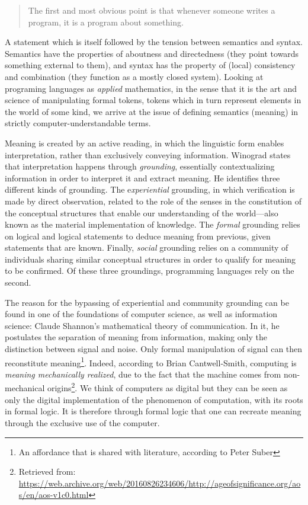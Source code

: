 \documentclass{article}
\begin{document}
\begin{quote}
  The first and most obvious point is that whenever someone writes a program, it is a program about something.\cite{winograd_language_1982}
\end{quote}

A statement which is itself followed by the tension between semantics and syntax. Semantics have the properties of aboutness and directedness (they point towards something external to them), and syntax has the property of (local) consistency and combination (they function as a mostly closed system). Looking at programing languages as \emph{applied} mathematics, in the sense that it is the art and science of manipulating formal tokens, tokens which in turn represent elements in the world of some kind, we arrive at the issue of defining semantics (meaning) in strictly computer-understandable terms.

Meaning is created by an active reading, in which the linguistic form enables interpretation, rather than exclusively conveying information. Winograd states that interpretation happens through \emph{grounding}, essentially contextualizing information in order to interpret it and extract meaning. He identifies three different kinds of grounding. The e\emph{xperiential} grounding, in which verification is made by direct observation, related to the role of the senses in the constitution of the conceptual structures that enable our understanding of the world—also known as the material implementation of knowledge. The \emph{formal} grounding relies on logical and logical statements to deduce meaning from previous, given statements that are known. Finally, \emph{social} grounding relies on a community of individuals sharing similar conceptual structures in order to qualify for meaning to be confirmed. Of these three groundings, programming languages rely on the second.

The reason for the bypassing of experiential and community grounding can be found in one of the foundations of computer science, as well as information science: Claude Shannon's mathematical theory of communication. In it, he postulates the separation of meaning from information, making only the distinction between signal and noise. Only formal manipulation of signal can then reconstitute meaning\footnote{An affordance that is shared with literature, according to Peter Suber\cite{suber_what_1988}}. Indeed, according to Brian Cantwell-Smith, computing is \emph{meaning mechanically realized}, due to the fact that the machine comes from non-mechanical origins\footnote{Retrieved from: \url{https://web.archive.org/web/20160826234606/http://ageofsignificance.org/aos/en/aos-v1c0.html}}. We think of computers as digital but they can be seen as only the digital implementation of the phenomenon of computation, with its roots in formal logic. It is therefore through formal logic that one can recreate meaning through the exclusive use of the computer.
\end{document}
